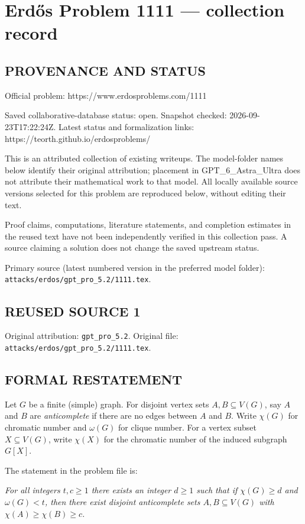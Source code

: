 \section*{Erd\H{o}s Problem 1111 --- collection record}

\subsection*{PROVENANCE AND STATUS}
Official problem: https://www.erdosproblems.com/1111

Saved collaborative-database status: open.
Snapshot checked: 2026-09-23T17:22:24Z.
Latest status and formalization links: https://teorth.github.io/erdosproblems/

This is an attributed collection of existing writeups. The model-folder names below identify their original attribution; placement in GPT\_6\_Astra\_Ultra does not attribute their mathematical work to that model. All locally available source versions selected for this problem are reproduced below, without editing their text.

Proof claims, computations, literature statements, and completion estimates in the reused text have not been independently verified in this collection pass. A source claiming a solution does not change the saved upstream status.

Primary source (latest numbered version in the preferred model folder): \texttt{attacks/erdos/gpt\_pro\_5.2/1111.tex}.

\subsection*{REUSED SOURCE 1}
Original attribution: \texttt{gpt\_pro\_5.2}.
Original file: \texttt{attacks/erdos/gpt\_pro\_5.2/1111.tex}.


\subsection*{FORMAL RESTATEMENT}
Let $G$ be a finite (simple) graph.
For disjoint vertex sets $A,B\subseteq V(G)$, say $A$ and $B$ are \emph{anticomplete} if there are no edges between $A$ and $B$.
Write $\chi(G)$ for chromatic number and $\omega(G)$ for clique number.
For a vertex subset $X\subseteq V(G)$, write $\chi(X)$ for the chromatic number of the induced subgraph $G[X]$.

The statement in the problem file is:

\emph{For all integers $t,c\ge 1$ there exists an integer $d\ge 1$ such that if $\chi(G)\ge d$ and $\omega(G)<t$, then there exist disjoint anticomplete sets $A,B\subseteq V(G)$ with $\chi(A)\ge \chi(B)\ge c$.}


